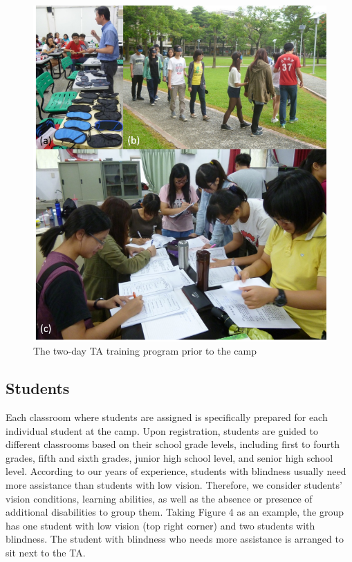 \documentclass[11.5pt]{sig-alternate} %
\begin{document}
\begin{large}
\begin{figure}[h]
    \centering
    \includegraphics[width=1\linewidth]{Fig3.png}
    \caption{The two-day TA training program prior to the camp}
\end{figure}

\subsection*{Students}

Each classroom where students are assigned is specifically prepared for each individual student at the camp. Upon registration, students are guided to different classrooms based on their school grade levels, including first to fourth grades, fifth and sixth grades, junior high school level, and senior high school level. According to our years of experience, students with blindness usually need more assistance than students with low vision. Therefore, we consider students’ vision conditions, learning abilities, as well as the absence or presence of additional disabilities to group them. Taking Figure 4 as an example, the group has one student with low vision (top right corner) and two students with blindness. The student with blindness who needs more assistance is arranged to sit next to the TA. 


\end{large}
\end{document}
